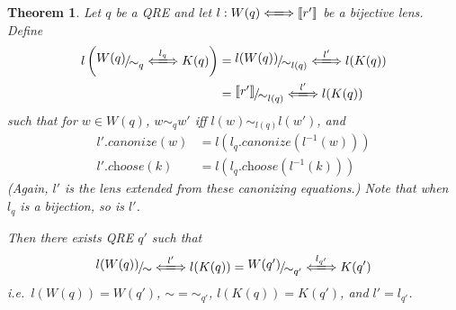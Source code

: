 \documentclass[a4paper,11pt] {article}
\theoremstyle{plain}
\newtheorem{theorem}{Theorem}[section]
\newcommand{\lcanonize}[1]{\textit{$#1$.canonize}}
\newcommand{\lchoose}[1]{\textit{$#1$.choose}}
\newcommand{\lensbetween}[1]{\xLongleftrightarrow{#1}}
\newcommand{\niceFrac}[2]{%
    \raise.5ex\hbox{$#1$}%
    \kern-.1em/\kern-.15em%
    \lower.25ex\hbox{$#2$}}
\begin{document}
\begin{theorem}
  \label{thm:lens-functor}
  Let $q$ be a QRE and
  let $l: W(q) \lensbetween{} \llbracket r' \rrbracket$ be a bijective lens.
  Define
  \begin{align*}
    l\left(\niceFrac{W(q)}{\sim_q} \lensbetween{l_q} K(q)\right)
    &= \niceFrac{l(W(q))}{\sim_{l(q)}} \lensbetween{l'} l(K(q)) \\
    &= \niceFrac{\llbracket r' \rrbracket}{\sim_{l(q)}} \lensbetween{l'} l(K(q))
  \end{align*}
  such that for $w \in W(q)$, $w \sim_q w'$ iff $l(w) \sim_{l(q)} l(w')$,
  and
  \begin{align*}
    \lcanonize{l'}(w)
    &= l(\lcanonize{l_q}(l^{-1}(w))) \\
    \lchoose{l'}(k)
    &= l(\lchoose{l_q}(l^{-1}(k)))
  \end{align*}
  (Again, $l'$ is the lens extended from these canonizing equations.)
  Note that when $l_q$ is a bijection, so is $l'$.
  
  Then there exists QRE $q'$ such that
  \begin{align*}
    \niceFrac{l(W(q))}{\sim} \lensbetween{l'} l(K(q))
    = \niceFrac{W(q')}{\sim_{q'}} \lensbetween{l_{q'}} K(q')
  \end{align*}
  i.e.\ $l(W(q)) = W(q')$, $\sim{} = {}\sim_{q'}$, $l(K(q)) = K(q')$,
  and $l' = l_{q'}$.
\end{theorem}
\end{document}
